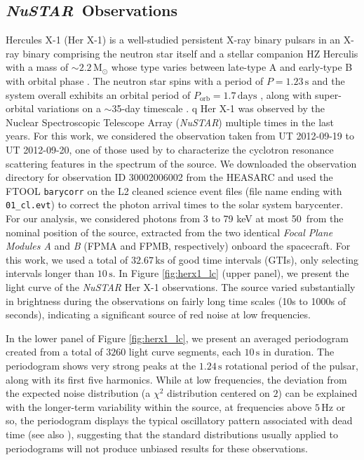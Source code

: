\documentclass[12pt]{emulateapj}
\newcommand{\project}[1]{\textsl{#1}}
\newcommand{\nustar}{\project{NuSTAR}\xspace}
\begin{document}
\subsection{\nustar\ Observations}

\begin{bf}
Hercules X-1 (Her X-1) is a well-studied persistent X-ray binary pulsars \citep{tananbaum1972} in an X-ray binary comprising the neutron star itself and a stellar companion HZ Herculis \citep{davidsen1972,forman1972,bahcall1972} with a mass of $\sim$$2.2 \,\mathrm{M}_\odot$ \citep{reynolds1997,leahy2014} whose type varies between late-type A and early-type B with orbital phase \citep{anderson1994,cheng1995} . The neutron star spins with a period of $P = 1.23\,\mathrm{s}$ \citep{tananbaum1972} and the system overall exhibits an orbital period of $P_\mathrm{orb} = 1.7\,\mathrm{days}$ \citep{bahcall1972}, along with super-orbital variations on a $\sim$35-day timescale \citep{giacconi1973,scott1999,igna2011}.
q
Her X-1 was observed by the Nuclear Spectroscopic Telescope Array (\nustar) multiple times in the last years. 
For this work, we considered the observation taken from UT 2012-09-19 to UT 2012-09-20, one of those used by \citet{fuerst13} to characterize the cyclotron resonance scattering features in the spectrum of the source.
We downloaded the observation directory for observation ID 30002006002 from the HEASARC and used the FTOOL \texttt{barycorr} on the L2 cleaned science event files (file name ending with \verb|01_cl.evt|) to correct the photon arrival times to the solar system barycenter.
For our analysis, we considered photons from 3 to 79 keV at most 50\arcsec\ from the nominal position of the source, extracted from the two identical \textit{Focal Plane Modules A} and \textit{B} (FPMA and FPMB, respectively) onboard the spacecraft.
For this work, we used a total of $32.67\,\mathrm{ks}$ of good time intervals (GTIs), only selecting intervals longer than $10\,\mathrm{s}$. In Figure \ref{fig:herx1_lc} (upper panel), we present the light curve of the \nustar Her X-1 observations. The source varied substantially in brightness during the observations on fairly long time scales (10s to 1000s of seconds), indicating a significant source of red noise at low frequencies.

In the lower panel of Figure \ref{fig:herx1_lc}, we present an averaged periodogram created from a total of $3260$ light curve segments, each $10\,\mathrm{s}$ in duration. The periodogram shows very strong peaks at the $1.24\,\mathrm{s}$ rotational period of the pulsar, along with its first five harmonics. While at low frequencies, the deviation from the expected noise distribution (a $\chi^2$ distribution centered on $2$) can be explained with the longer-term variability within the source, at frequencies above $5 \,\mathrm{Hz}$ or so, the periodogram displays the typical oscillatory pattern associated with dead time (see also \citealt{Bachetti+15}), suggesting that the standard distributions usually applied to periodograms will not produce unbiased results for these observations.


\end{bf}
\end{document}
